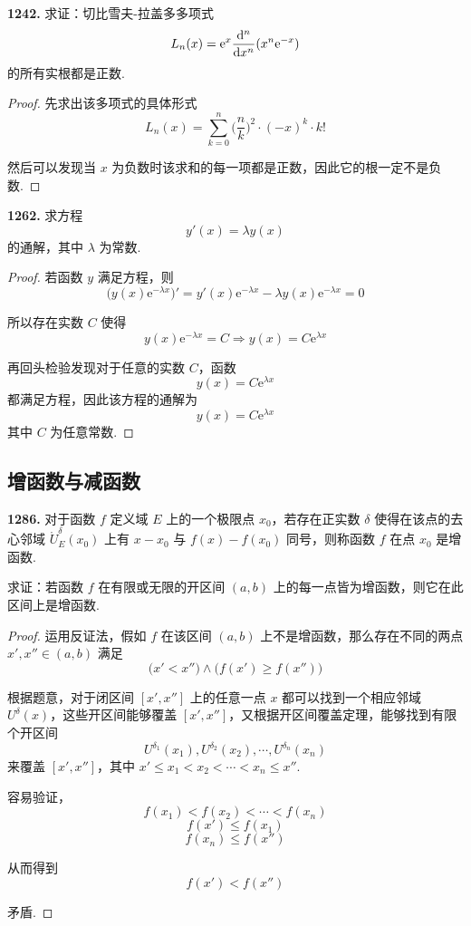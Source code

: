 \textbf{1242.} 求证：切比雪夫-拉盖多多项式
\[L_n(x) = \mathrm{e}^x \frac{\mathop{}\!\mathrm{d}^n}{\mathop{}\!\mathrm{d} x^n}(x^n \mathrm{e}^{-x})\]
的所有实根都是正数.

\begin{proof}
    先求出该多项式的具体形式
    \[L_n(x) = \sum_{k=0}^{n} \biggl(\frac{n}{k}\biggr)^2 \cdot (-x)^k \cdot k!\]

    然后可以发现当 $x$ 为负数时该求和的每一项都是正数，因此它的根一定不是负数.
\end{proof}

\textbf{1262.} 求方程
\[y'(x) = \lambda y(x)\]
的通解，其中 $\lambda$ 为常数.

\begin{proof}
    若函数 $y$ 满足方程，则
    \[\bigl(y(x) \mathrm{e}^{-\lambda x}\bigr)' = y'(x) \mathrm{e}^{-\lambda x} - \lambda y(x) \mathrm{e}^{-\lambda x} = 0\]

    所以存在实数 $C$ 使得
    \[y(x) \mathrm{e}^{-\lambda x} = C \Rightarrow y(x) = C \mathrm{e}^{\lambda x}\]

    再回头检验发现对于任意的实数 $C$，函数
    \[y(x) = C \mathrm{e}^{\lambda x}\]
    都满足方程，因此该方程的通解为
    \[y(x) = C \mathrm{e}^{\lambda x}\]
    其中 $C$ 为任意常数.
\end{proof}

\subsection{增函数与减函数}
\textbf{1286.} 对于函数 $f$ 定义域 $E$ 上的一个极限点 $x_0$，若存在正实数 $\delta$ 使得在该点的去心邻域 $\mathring{U}^\delta_E(x_0)$ 上有 $x - x_0$ 与 $f(x) - f(x_0)$ 同号，则称函数 $f$ 在点 $x_0$ 是增函数.

求证：若函数 $f$ 在有限或无限的开区间 $(a,b)$ 上的每一点皆为增函数，则它在此区间上是增函数.

\begin{proof}
    运用反证法，假如 $f$ 在该区间 $(a,b)$ 上不是增函数，那么存在不同的两点 $x', x'' \in (a,b)$ 满足
    \[\bigl(x' < x''\bigr) \wedge \bigl(f(x') \geqslant f(x'')\bigr)\]

    根据题意，对于闭区间 $[x', x'']$ 上的任意一点 $x$ 都可以找到一个相应邻域 $U^\delta(x)$，这些开区间能够覆盖 $[x', x'']$，又根据开区间覆盖定理，能够找到有限个开区间
    \[U^{\delta_1}(x_1), U^{\delta_2}(x_2), \cdots, U^{\delta_n}(x_n)\]
    来覆盖 $[x', x'']$，其中 $x' \leqslant x_1 < x_2 < \cdots < x_n \leqslant x''$.

    容易验证，
    \[f(x_1) < f(x_2) < \cdots < f(x_n)\]
    \[f(x') \leqslant f(x_1)\]
    \[f(x_n) \leqslant f(x'')\]

    从而得到
    \[f(x') < f(x'')\]

    矛盾.
\end{proof}

